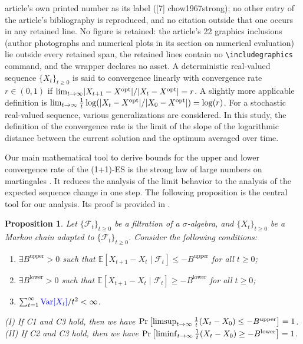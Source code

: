 \documentclass[10pt,a4paper]{amsart}
\theoremstyle{plain}
\newtheorem{proposition}{Proposition}
\DeclareMathOperator{\Var}{Var}
\DeclarePairedDelimiter{\abs}{\lvert}{\rvert}
\providecommand{\E}{\mathbb{E}}
\providecommand{\limsup}{\operatornamewithlimits{limsup}}
\providecommand{\liminf}{\operatornamewithlimits{liminf}}
\begin{document}
article's own printed number as its label ([7] chow1967strong); no other entry of the article's bibliography is reproduced, and no citation outside that one occurs in any retained line. No figure is retained: the article's 22 graphics inclusions (author photographs and numerical plots in its section on numerical evaluation) lie outside every retained span, the retained lines contain no \texttt{\textbackslash includegraphics} command, and the wrapper declares no asset.
A deterministic real-valued sequence $\{X_t\}_{t\geq 0}$ is said to convergence linearly with convergence rate $r \in (0, 1)$ if
$\lim_{t\to\infty} \abs*{X_{t+1} - X^\mathrm{opt}}/\abs*{X_t - X^\mathrm{opt}} = r$. A slightly more applicable definition is $\lim_{t\to\infty} \frac{1}{t}\log (\abs*{X_{t} - X^\mathrm{opt}} /\abs*{X_0 - X^\mathrm{opt}}) = \log(r)$.
For a stochastic real-valued sequence, various generalizations are considered. 
In this study, the definition of the convergence rate is the limit of the slope of the logarithmic distance between the current solution and the optimum averaged over time.

Our main mathematical tool to derive bounds for the upper and lower convergence rate of the (1+1)-ES is the strong law of large numbers on martingales \cite{chow1967strong}.
It reduces the analysis of the limit behavior to the analysis of the expected sequence change in one step. 
The following proposition is the central tool for our analysis.
Its proof is provided in .

\setcounter{proposition}{1}
\begin{proposition}\label{prop:convergence_rate}
Let $\{\mathcal{F}_t\}_{t \geq 0}$ be a filtration of a $\sigma$-algebra, and $\{X_t\}_{t \geq 0}$ be a Markov chain adapted to $\{\mathcal{F}_t\}_{t \geq 0}$.
Consider the following conditions:
\begin{enumerate}
\item[C1] $\exists B^\mathrm{upper} > 0$ such that $\E[X_{t+1} - X_{t} \mid \mathcal{F}_t] \leq - B^\mathrm{upper}$ for all $t \geq 0$;
\item[C2] $\exists B^\mathrm{lower} > 0$ such that $\E[X_{t+1} - X_{t} \mid \mathcal{F}_t] \geq - B^\mathrm{lower}$ for all $t \geq 0$;
\item[C3] $\sum_{t=1}^{\infty}{\color{blue}\Var[X_{t}]} / t^2 < \infty$.
\end{enumerate}
(I) If C1 and C3 hold, then we have
$\Pr\left[\limsup_{t \to \infty} \frac{1}{t} (X_t - X_0) \leq - B^\mathrm{upper} \right] = 1$.
(II) If C2 and C3 hold, then we have 
$\Pr\left[\liminf_{t \to \infty} \frac{1}{t} (X_t - X_0) \geq - B^\mathrm{lower} \right] = 1$.
\end{proposition}
\end{document}
